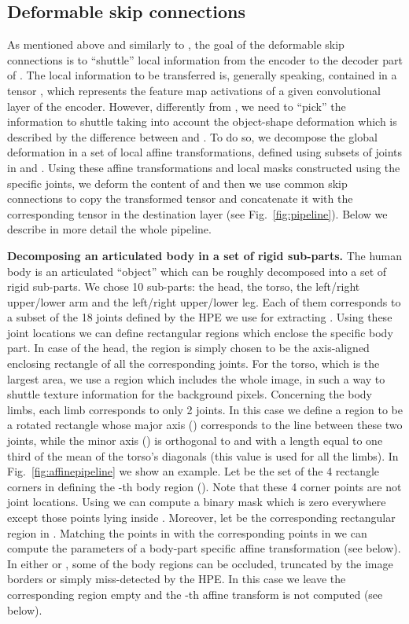 \documentclass[10pt,twocolumn,letterpaper]{article}
\begin{document}
\subsection{Deformable skip connections}
\label{skip-connections}

As mentioned above  and similarly to  \cite{pix2pix2016},
the goal of the deformable skip connections is to ``shuttle'' local information from the encoder to the decoder part of . The local information to be transferred is, generally speaking, contained in a tensor , which represents the feature map activations of a given convolutional layer of the encoder.
However, differently from \cite{pix2pix2016}, we need to ``pick''
the information to shuttle taking into account  the object-shape deformation which is  described by the difference between  and .
To do so, we decompose the global deformation in a set of local affine transformations, defined using subsets of joints in  and .
Using these affine transformations and local masks constructed using the specific joints, we deform the content of  and then we use common skip connections
to copy the transformed tensor and concatenate it with the corresponding tensor in the destination layer (see  Fig.~\ref{fig:pipeline}).
Below we describe in more detail the whole pipeline.

{\bf Decomposing an articulated body in a set of rigid sub-parts.} 
The human body is an articulated ``object'' which can be roughly decomposed into a set of rigid sub-parts. We chose 10 sub-parts: the head, the torso, the left/right upper/lower arm and the  left/right upper/lower leg. Each of them corresponds to a subset of the 18 joints defined by the HPE  \cite{Cao} we use for extracting . 
Using these  joint locations we can define rectangular regions which enclose the specific body part.
In case of  the head, the  region is simply chosen to be the axis-aligned enclosing rectangle of all the corresponding joints. For the torso, which is the largest area, we use a region which includes  the whole image, in such a way to shuttle  texture information for the background pixels.
Concerning the body limbs, each limb corresponds to only 2 joints. In this case we define a region to be a rotated rectangle whose major axis () corresponds to the line between these two joints, while the minor axis () is orthogonal to  and with a length equal to one third of the mean of the torso's diagonals (this value is used for all the limbs). In Fig.~\ref{fig:affinepipeline} we show an example.
 Let  be the set of the 4 rectangle corners in  defining the -th body region ().
 Note that these 4 corner points are not joint locations.
 Using    we can compute a binary mask   which is zero everywhere except those points  lying inside  .
Moreover, let  be the corresponding rectangular region in . Matching the points in  with the corresponding points in  we can compute the parameters of a body-part specific affine transformation (see below).
In  either   or , some of the body regions can be occluded, truncated by the image borders or simply miss-detected by the HPE. In this case we leave  the corresponding region  empty and the -th affine transform is not computed (see below). 
\end{document}

